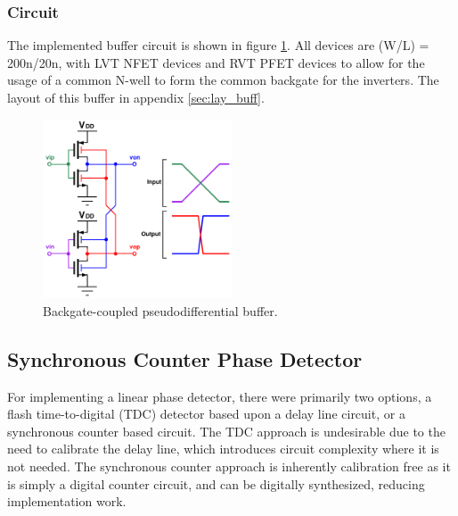 		\subsubsection{Circuit}
		The implemented buffer circuit is shown in figure \ref{fig:pd_buffer_circuit}. All devices are (W/L) = 200n/20n, with LVT NFET devices and RVT PFET devices to allow for the usage of a common N-well to form the common backgate for the inverters. The layout of this buffer in appendix \ref{sec:lay_buff}.
			\begin{figure}[htb!]
			        \centering
			        \includegraphics[width=0.5\textwidth, angle=0]{./figs/design/pseudiff_buffer}
			    \caption{Backgate-coupled pseudodifferential buffer.}
			    \label{fig:pd_buffer_circuit}
			\end{figure}



	\FloatBarrier
	\subsection{Synchronous Counter Phase Detector}
	For implementing a linear phase detector, there were primarily two options, a flash time-to-digital (TDC) detector based upon a delay line circuit, or a synchronous counter based circuit. The TDC approach is undesirable due to the need to calibrate the delay line, which introduces circuit complexity where it is not needed. The synchronous counter approach is inherently calibration free as it is simply a digital counter circuit, and can be digitally synthesized, reducing implementation work. 

